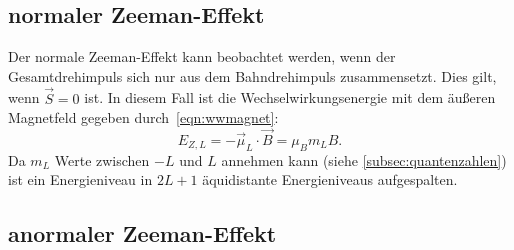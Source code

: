 \subsection*{normaler Zeeman-Effekt}
Der normale Zeeman-Effekt kann beobachtet werden, wenn der Gesamtdrehimpuls
sich nur aus dem Bahndrehimpuls zusammensetzt. Dies gilt, wenn $\vec{S} = 0$
ist. In diesem Fall ist die Wechselwirkungsenergie mit dem äußeren Magnetfeld
gegeben durch~\ref{eqn:wwmagnet}:
\begin{equation}
  E_{Z,L} = - \vec{\mu}_{L} \cdot \vec{B} = \mu_{B} m_{L} B.
  \label{eqn:wwmagnet}
\end{equation}
Da $m_{L}$ Werte zwischen $-L$ und $L$ annehmen kann (siehe \ref{subsec:quantenzahlen})
ist ein Energieniveau in $2L+1$ äquidistante Energieniveaus aufgespalten.
\subsection*{anormaler Zeeman-Effekt}
